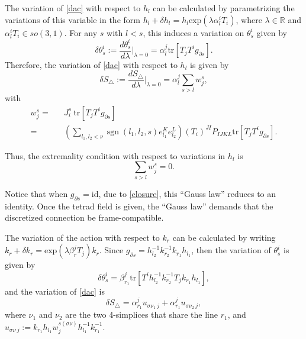 \documentclass{article}
\DeclareMathOperator{\sgn}{sgn}
\begin{document}
The variation of \eqref{dac} with respect to $h_{l}$ can be calculated by parametrizing the variations of this variable in the form $h_{l}+\delta h_{l}=h_{l}\text{exp}(\lambda\alpha_{l}^{i}T_{i})$, where $\lambda\in\mathbb{R}$ and $\alpha_{l}^{i}T_{i}\in so(3,1)$. For any $s$ with $l < s$, this induces a variation on $\theta_{s}^{i}$ given by
\begin{equation}\label{varth}
	\delta\theta_{s}^{i}:=\dfrac{d\theta_{s}^{i}}{d\lambda}\bigg\rvert_{\lambda=0}=\alpha_{l}^{j}\text{tr}\left[T_{j}T^{i}g_{\partial s}\right]. 
\end{equation}	
Therefore, the variation of \eqref{dac} with respect to $h_{l}$ is given by
\begin{equation}\label{var1}
	\delta S_{\triangle}:=\dfrac{d S_{\triangle}}{d\lambda}\bigg\rvert_{\lambda=0}=\alpha_{l}^{j}\sum_{s>l}w^s_{j},
\end{equation}
with	
\begin{eqnarray}\label{ws}
	w^s_{j}=&
	&J^s_{i} \ \text{tr}\left[T_{j}T^{i}g_{\partial s}\right] \nonumber \\ 
	=&
	&\left( \sum_{l_1, l_2 <\nu}\sgn(l_1, l_2, s)e_{l_1}^{K}e_{l_2}^{L}\right) \left(T_{i}\right)^{JI}P_{IJKL}\text{tr}\left[T_{j}T^{i}g_{\partial s}\right]
	. 
\end{eqnarray}

Thus, the extremality condition with respect to variations in $h_{l}$ is 
\begin{equation}\label{feq1}
	\sum_{s>l}w^s_{j}=0 . 
\end{equation}
%


Notice that when $g_{\partial s}= \mbox{id}$, due to \eqref{closure}, this ``Gauss law'' reduces to an identity. Once the tetrad field is given, the ``Gauss law'' demands that the discretized connection be frame-compatible. 


The variation of the action with respect to $k_{r}$ can be calculated by writing $k_{r}+\delta k_{r}=\text{exp}(\lambda\beta_{r}^{j}T_{j})k_{r}$. Since $g_{\partial s}=h_{l_2}^{-1}k_{r_2}^{-1}k_{r_1}h_{l_1}$, then the variation of $\theta_{s}^{i}$ is given by
\begin{displaymath}
	\delta\theta_{s}^{i}=\beta_{r_1}^{j}\text{tr}\left[T^{i}h_{l_2}^{-1}k_{r_2}^{-1}T_{j}k_{r_1}h_{l_1}\right],
\end{displaymath}	 
and the variation of \eqref{dac} is
\begin{equation}\label{var2}
	\delta S_{\triangle}=\alpha_{r_1}^{j}u_{\sigma\nu_1~j}+\alpha_{r_1}^{j}u_{\sigma\nu_2~j} , 
\end{equation}	
where $\nu_1$ and $\nu_2$ are the two 4-simplices that share the line $r_1$, and $u_{\sigma\nu~j}:=k_{r_1}h_{l_1}w^{s(\sigma \nu)}_jh_{l_1}^{-1}k_{r_1}^{-1}$. 
\end{document}
